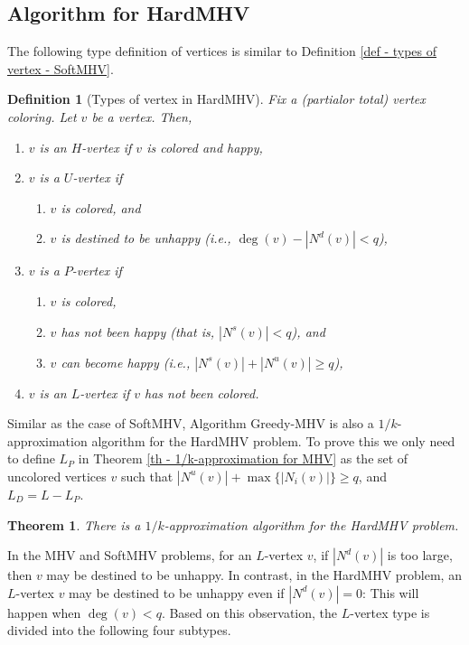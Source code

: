 \documentclass[11pt]{article}
\newtheorem{theorem}{Theorem}[section]
\newtheorem{definition}{Definition}[section]
\newcommand{\qed}{\vrule height4pt width4pt depth2pt}
\begin{document}
\subsection{Algorithm for HardMHV}
The following type definition of vertices is similar to
Definition \ref{def - types of vertex - SoftMHV}.

\begin{definition}[Types of vertex in HardMHV]
Fix a (partialor total) vertex coloring. Let $v$ be a vertex. Then,
\begin{enumerate}
\item $v$ is an $H$-vertex if $v$ is colored and happy,

\item $v$ is a $U$-vertex if
\begin{enumerate}
\item $v$ is colored, and
\item $v$ is destined to be unhappy (i.e., $\deg(v) - |N^d(v)| < q$),
\end{enumerate}

\item $v$ is a $P$-vertex if
\begin{enumerate}
\item $v$ is colored,
\item $v$ has not been happy (that is, $|N^s(v)| < q$), and
\item $v$ can become happy (i.e., $|N^s(v)| + |N^u(v)| \geq q$),
\end{enumerate}

\item $v$ is an $L$-vertex if $v$ has not been colored.
\end{enumerate}
\end{definition}

Similar as the case of SoftMHV, Algorithm {\sc Greedy-MHV} is also
a $1/k$-approximation algorithm for the HardMHV problem. To prove this
we only need to define $L_P$ in Theorem \ref{th - 1/k-approximation for MHV}
as the set of uncolored vertices $v$ such that
$|N^u(v)| + \max \{|N_i(v)|\} \geq q$, and $L_D = L - L_P$.

\begin{theorem}
There is a $1/k$-approximation algorithm for the HardMHV problem. \qed
\end{theorem}


In the MHV and SoftMHV problems, for an $L$-vertex $v$, if $|N^d (v)|$ is
too large, then $v$ may be destined to be unhappy.
In contrast, in the HardMHV problem, an $L$-vertex $v$ may be destined to
be unhappy even if $|N^d (v)| = 0$: This will happen when $\deg(v) < q$.
Based on this observation, the $L$-vertex type is divided into the following
four subtypes.
\end{document}
